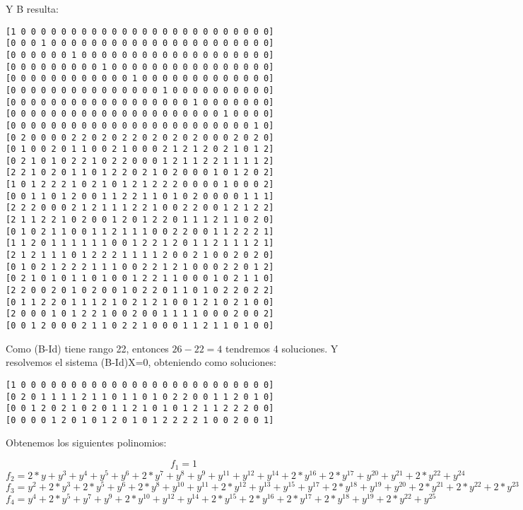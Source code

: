 \documentclass[a4paper]{article}
\begin{document}
Y B resulta:

\begin{verbatim}
[1 0 0 0 0 0 0 0 0 0 0 0 0 0 0 0 0 0 0 0 0 0 0 0 0 0]
[0 0 0 1 0 0 0 0 0 0 0 0 0 0 0 0 0 0 0 0 0 0 0 0 0 0]
[0 0 0 0 0 0 1 0 0 0 0 0 0 0 0 0 0 0 0 0 0 0 0 0 0 0]
[0 0 0 0 0 0 0 0 0 1 0 0 0 0 0 0 0 0 0 0 0 0 0 0 0 0]
[0 0 0 0 0 0 0 0 0 0 0 0 1 0 0 0 0 0 0 0 0 0 0 0 0 0]
[0 0 0 0 0 0 0 0 0 0 0 0 0 0 0 1 0 0 0 0 0 0 0 0 0 0]
[0 0 0 0 0 0 0 0 0 0 0 0 0 0 0 0 0 0 1 0 0 0 0 0 0 0]
[0 0 0 0 0 0 0 0 0 0 0 0 0 0 0 0 0 0 0 0 0 1 0 0 0 0]
[0 0 0 0 0 0 0 0 0 0 0 0 0 0 0 0 0 0 0 0 0 0 0 0 1 0]
[0 2 0 0 0 0 2 2 0 2 0 2 2 0 2 0 2 0 2 0 0 0 2 0 2 0]
[0 1 0 0 2 0 1 1 0 0 2 1 0 0 0 2 1 2 1 2 0 2 1 0 1 2]
[0 2 1 0 1 0 2 2 1 0 2 2 0 0 0 1 2 1 1 2 2 1 1 1 1 2]
[2 2 1 0 2 0 1 1 0 1 2 2 0 2 1 0 2 0 0 0 1 0 1 2 0 2]
[1 0 1 2 2 2 1 0 2 1 0 1 2 1 2 2 2 0 0 0 0 1 0 0 0 2]
[0 0 1 1 0 1 2 0 0 1 1 2 2 1 1 0 1 0 2 0 0 0 0 1 1 1]
[2 2 2 0 0 0 2 1 2 1 1 1 2 2 1 0 0 2 2 0 0 1 2 1 2 2]
[2 1 1 2 2 1 0 2 0 0 1 2 0 1 2 2 0 1 1 1 2 1 1 0 2 0]
[0 1 0 2 1 1 0 0 1 1 2 1 1 1 0 0 2 2 0 0 1 1 2 2 2 1]
[1 1 2 0 1 1 1 1 1 1 0 0 1 2 2 1 2 0 1 1 2 1 1 1 2 1]
[2 1 2 1 1 1 0 1 2 2 2 1 1 1 1 2 0 0 2 1 0 0 2 0 2 0]
[0 1 0 2 1 2 2 2 1 1 1 0 0 2 2 1 2 1 0 0 0 2 2 0 1 2]
[0 2 1 0 1 0 1 1 0 1 0 0 1 2 2 1 1 0 0 0 1 0 2 1 1 0]
[2 2 0 0 2 0 1 0 2 0 0 1 0 2 2 0 1 1 0 1 0 2 2 0 2 2]
[0 1 1 2 2 0 1 1 1 2 1 0 2 1 2 1 0 0 1 2 1 0 2 1 0 0]
[2 0 0 0 1 0 1 2 2 1 0 0 2 0 0 1 1 1 1 0 0 0 2 0 0 2]
[0 0 1 2 0 0 0 2 1 1 0 2 2 1 0 0 0 1 1 2 1 1 0 1 0 0]
\end{verbatim}

Como (B-Id) tiene rango 22, entonces $26-22=4$ tendremos 4 soluciones.
Y resolvemos el sistema (B-Id)X=0, obteniendo como soluciones:

\begin{verbatim}
[1 0 0 0 0 0 0 0 0 0 0 0 0 0 0 0 0 0 0 0 0 0 0 0 0 0]
[0 2 0 1 1 1 1 2 1 1 0 1 1 0 1 0 2 2 0 0 1 1 2 0 1 0]
[0 0 1 2 0 2 1 0 2 0 1 1 2 1 0 1 0 1 2 1 1 2 2 2 0 0]
[0 0 0 0 1 2 0 1 0 1 2 0 1 0 1 2 2 2 2 1 0 0 2 0 0 1]
\end{verbatim}

Obtenemos los siguientes polinomios:

$$f_1 = 1$$
$$f_2 = 2*y+y^3+y^4+y^5+y^6+2*y^7+y^8+y^9+y^{11}+y^{12}+y^{14}+2*y^{16}+2*y^{17}+y^{20}+y^{21}+2*y^{22}+y^{24}$$
$$f_3 = y^2+2*y^3+2*y^5+y^6+2*y^8+y^{10}+y^{11}+2*y^{12}+y^{13}+y^{15}+y^{17}+2*y^{18}+y^{19}+y^{20}+2*y^{21}+2*y^{22}+2*y^{23}$$
$$f_4 = y^4+2*y^5+y^7+y^9+2*y^{10}+y^{12}+y^{14}+2*y^{15}+2*y^{16}+2*y^{17}+2*y^{18}+y^{19}+2*y^{22}+y^{25}$$
\end{document}
